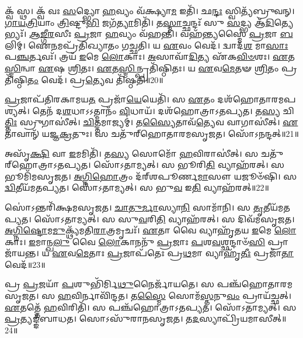 𑌕𑍍𑌵᳴ 𑌸𑍍𑌥।
𑌕𑍍𑌵᳴ 𑌵𑌃 \ul{𑌸}\-𑌦𑍍𑌭𑍍𑌯𑍋 \ul{𑌹}\-𑌵𑍍𑌯𑌂 𑌵᳴𑌕𑍍𑌷𑍍𑌯𑌾\-\ul{𑌮} 𑌇𑌤𑌿᳴।
𑌛\-\ul{𑌨𑍍𑌦𑌃} 𑌸𑍍𑌵𑌿𑌤𑍍𑌯᳴𑌬𑍍𑌰𑍁𑌵𑌨𑍍।
\-\ul{𑌗𑌾}\-\-\ul{𑌯}\-\-\ul{𑌤𑍍𑌰𑌿}\-𑌯𑌾𑌂 \ul{𑌤𑍍𑌰𑌿}\-𑌷𑍍𑌟𑍁\-\ul{𑌭𑌿} 𑌜𑌗᳴\-\ul{𑌤𑍍𑌯𑌾}\-𑌮𑌿𑌤𑌿᳴।
𑌤\-\ul{𑌸𑍍𑌮𑌾}\-𑌚𑍍𑌛𑌨𑍍𑌦𑌃᳴ 𑌸𑍁 \ul{𑌸}\-𑌦𑍍𑌭𑍍𑌯 𑌆᳴\-\ul{𑌦𑌿}\-𑌤𑍍𑌯𑍇𑌭𑍍𑌯𑌃᳴।
\-\ul{𑌆}\-\-\ul{𑌙𑍍𑌗𑍀}\-\-\ul{𑌰}\-𑌸𑍀𑌃 \ul{𑌪𑍍𑌰}\-𑌜𑌾 \ul{𑌹}\-𑌵𑍍𑌯𑌂 𑌵᳴𑌹𑌨𑍍𑌤𑌿।
𑌵𑌹᳴𑌨𑍍𑌤𑍍𑌯𑌸𑍍𑌮𑍈 \ul{𑌪𑍍𑌰}\-𑌜𑌾 \ul{𑌬}\-𑌲𑌿𑌮𑍍।
𑌐\-\ul{𑌨}\-𑌮𑌪𑍍𑌰᳴𑌤𑌿𑌖𑍍𑌯𑌾𑌤𑌂 𑌗𑌚𑍍𑌛𑌤𑌿।
𑌯 \ul{𑌏}\-𑌵𑌂 𑌵𑍇𑌦᳴।
𑌦𑍍𑌵𑌾𑌦᳴\-\ul{𑌶} 𑌮𑌾\-\ul{𑌸𑌾𑌃} 𑌪\-\ul{𑌞𑍍𑌚}\-𑌰𑍍𑌤𑌵𑌃᳴।
𑌤𑍍𑌰𑌯᳴ \ul{𑌇}\-𑌮𑍇 \ul{𑌲𑍋}\-𑌕𑌾𑌃।
\-\ul{𑌅}\-𑌸𑌾𑌵𑌾᳴\-\ul{𑌦𑌿}\-𑌤𑍍𑌯 𑌏᳴𑌕\-\ul{𑌵𑌿}\-\-\ul{𑍞}\-𑌶𑌃।
\-\ul{𑌏}\-𑌤\-\ul{𑌸𑍍𑌮𑌿}\-𑌨𑍍𑌵𑌾 \ul{𑌏}\-𑌷 \ul{𑌶𑍍𑌰𑌿}\-𑌤𑌃।
\-\ul{𑌏}\-𑌤\-\ul{𑌸𑍍𑌮𑌿}\-𑌨𑍍𑌪𑍍𑌰𑌤𑌿᳴\-𑌷𑍍𑌠𑌿𑌤𑌃।
𑌯 \ul{𑌏}\-𑌵\-\ul{𑌮𑍇}\-𑌤𑍟 \ul{𑌶𑍍𑌰𑌿}\-𑌤𑌂 𑌪𑍍𑌰𑌤𑌿᳴\-𑌷𑍍𑌠𑌿\-\ul{𑌤𑌂} 𑌵𑍇𑌦᳴।
𑌪𑍍𑌰\-\ul{𑌤𑍍𑌯𑍇}\-𑌵 𑌤𑌿᳴𑌷𑍍𑌠𑌤𑌿॥20॥\anuvakamend[\-\ul{𑌸𑍍𑌯𑌾}\-𑌦𑌿𑌤𑌿᳴ 𑌸𑌂𑌵\-\ul{𑌥𑍍𑌸}\-𑌰𑍋 𑌜᳴𑌨𑌯\-\ul{𑌧𑍍𑌵}\-𑌮𑌿𑌤𑍀𑌤𑍍𑌯᳴𑌬𑍍𑌰\-\ul{𑌵𑍀}\-𑌤𑍍𑌪𑍂\-\ul{𑌰𑍍𑌵} 𑌇𑌤𑍍𑌯𑌾᳴\-\ul{𑌦𑌿}\-𑌤𑍍𑌯𑌾\-\ul{𑌨𑍃}\-𑌤\-\ul{𑌵𑌃} 𑌷𑌟𑍍𑌚᳴]

\-\ul{𑌪𑍍𑌰}\-𑌜𑌾𑌪᳴𑌤𑌿𑌰𑌕𑌾𑌮𑌯\-\ul{𑌤} 𑌪𑍍𑌰𑌜𑌾᳴\-\ul{𑌯𑍇}\-𑌯𑍇𑌤𑌿᳴।
𑌸 \ul{𑌏}\-𑌤𑌂 𑌦𑌶᳴𑌹𑍋𑌤𑌾𑌰𑌮𑌪𑌶𑍍𑌯𑌤𑍍।
𑌤𑍇𑌨᳴ 𑌦\-\ul{𑌶}\-𑌧𑌾\-𑌽𑌽𑌤𑍍𑌮𑌾𑌨𑌂᳴ \ul{𑌵𑌿}\-𑌧𑌾𑌯᳴।
𑌦𑌶᳴𑌹𑍋𑌤𑍍𑌰𑌾\-𑌽𑌤𑌪𑍍𑌯𑌤।
𑌤\-\ul{𑌸𑍍𑌯} 𑌚𑌿\-\ul{𑌤𑍍𑌤𑌿𑌃} 𑌸𑍍𑌰𑍁𑌗𑌾𑌸𑍀॑𑌤𑍍।
\-\ul{𑌚𑌿}\-𑌤𑍍𑌤𑌮𑌾𑌜𑍍𑌯𑌮𑍍॑।
𑌤\-\ul{𑌸𑍍𑌯𑍈}\-𑌤𑌾𑌵᳴\-\ul{𑌤𑍍𑌯𑍇}\-𑌵 𑌵𑌾𑌗𑌾𑌸𑍀॑𑌤𑍍।
\-\ul{𑌏}\-𑌤𑌾𑌵𑌾𑌨𑍍᳴ 𑌯𑌜𑍍𑌞\-\ul{𑌕𑍍𑌰}\-𑌤𑍁𑌃।
𑌸 𑌚𑌤𑍁᳴𑌰𑍍‌\mbox{}𑌹𑍋𑌤𑌾𑌰𑌮\-𑌸𑍃𑌜𑌤।
𑌸𑍋᳴𑌽𑌨𑌨𑍍𑌦𑌤𑍍॥21॥

𑌅𑌸𑍃᳴\-\ul{𑌕𑍍𑌷𑌿} 𑌵𑌾 \ul{𑌇}\-𑌮𑌮𑌿𑌤𑌿᳴।
𑌤\-\ul{𑌸𑍍𑌯} 𑌸𑍋𑌮𑍋᳴ \ul{𑌹}\-𑌵𑌿𑌰𑌾𑌸𑍀॑𑌤𑍍।
𑌸 𑌚𑌤𑍁᳴𑌰𑍍‌\mbox{}𑌹𑍋𑌤𑍍𑌰𑌾\-𑌽𑌤𑌪𑍍𑌯𑌤।
𑌸𑍋᳴𑌽𑌤𑌾𑌮𑍍𑌯𑌤𑍍।
𑌸 𑌭𑍂𑌰𑌿\-\ul{𑌤𑌿} 𑌵𑍍𑌯𑌾𑌹᳴𑌰𑌤𑍍।
𑌸 𑌭𑍂𑌮𑌿᳴𑌮\-𑌸𑍃𑌜𑌤।
\-\ul{𑌅}\-\-\ul{𑌗𑍍𑌨𑌿}\-\-\ul{𑌹𑍋}\-𑌤𑍍𑌰𑌂 𑌦᳴𑌰𑍍‌\mbox{}𑌶𑌪𑍂𑌰𑍍𑌣\-\ul{𑌮𑌾}\-𑌸𑍗 𑌯𑌜𑍂𑍞᳴𑌷𑌿।
𑌸 \ul{𑌦𑍍𑌵𑌿}\-𑌤𑍀𑌯᳴𑌮𑌤𑌪𑍍𑌯𑌤।
𑌸𑍋᳴𑌽𑌤𑌾𑌮𑍍𑌯𑌤𑍍।
𑌸 𑌭𑍁\-\ul{𑌵} 𑌇\-\ul{𑌤𑌿} 𑌵𑍍𑌯𑌾𑌹᳴𑌰𑌤𑍍॥22॥

𑌸𑍋॑𑌽𑌨𑍍𑌤𑌰𑌿᳴𑌕𑍍𑌷𑌮\-𑌸𑍃𑌜𑌤।
\-\ul{𑌚𑌾}\-\-\ul{𑌤𑍁}\-\-\ul{𑌰𑍍𑌮𑌾}\-𑌸𑍍𑌯𑌾\-\ul{𑌨𑌿} 𑌸𑌾𑌮𑌾᳴𑌨𑌿।
𑌸 \ul{𑌤𑍃}\-𑌤𑍀𑌯᳴𑌮𑌤𑌪𑍍𑌯𑌤।
𑌸𑍋᳴𑌽𑌤𑌾𑌮𑍍𑌯𑌤𑍍।
𑌸 𑌸𑍁\-\ul{𑌵}\-𑌰𑌿\-\ul{𑌤𑌿} 𑌵𑍍𑌯𑌾𑌹᳴𑌰𑌤𑍍।
𑌸 𑌦𑌿𑌵᳴𑌮\-𑌸𑍃𑌜𑌤।
\-\ul{𑌅}\-\-\ul{𑌗𑍍𑌨𑌿}\-\-\ul{𑌷𑍍𑌟𑍋}\-𑌮\-\ul{𑌮𑍁}\-𑌕𑍍𑌥𑍍𑌯᳴𑌮𑌤𑌿\-\ul{𑌰𑌾}\-𑌤𑍍𑌰𑌮𑍃𑌚𑌃᳴।
\-\ul{𑌏}\-𑌤𑌾 𑌵𑍈 𑌵𑍍𑌯𑌾𑌹𑍃᳴𑌤𑌯 \ul{𑌇}\-𑌮𑍇 \ul{𑌲𑍋}\-𑌕𑌾𑌃।
\-\ul{𑌇}\-𑌮𑌾𑌨𑍍𑌖\-\ul{𑌲𑍁} 𑌵𑍈 \ul{𑌲𑍋}\-𑌕𑌾𑌨𑌨𑍁᳴ \ul{𑌪𑍍𑌰}\-𑌜𑌾𑌃 \ul{𑌪}\-𑌶\-\ul{𑌵}\-𑌶𑍍𑌛𑌨𑍍𑌦𑌾𑍞᳴\-\ul{𑌸𑌿} 𑌪𑍍𑌰𑌾𑌜𑌾᳴𑌯𑌨𑍍𑌤।
𑌯 \ul{𑌏}\-𑌵\-\ul{𑌮𑍇}\-𑌤𑌾𑌃 \ul{𑌪𑍍𑌰}\-𑌜𑌾𑌪᳴𑌤𑍇𑌃 𑌪𑍍𑌰\-\ul{𑌥}\-𑌮𑌾 𑌵𑍍𑌯𑌾𑌹𑍃᳴\-\ul{𑌤𑍀𑌃} 𑌪𑍍𑌰𑌜𑌾᳴\-\ul{𑌤𑌾} 𑌵𑍇𑌦᳴॥23॥

𑌪𑍍𑌰 \ul{𑌪𑍍𑌰}\-𑌜𑌯𑌾᳴ \ul{𑌪}\-𑌶𑍁𑌭𑌿᳴𑌰𑍍𑌮𑌿\-\ul{𑌥𑍁}\-𑌨𑍈𑌰𑍍𑌜𑌾᳴𑌯𑌤𑍇।
𑌸 𑌪𑌞𑍍𑌚᳴𑌹𑍋𑌤𑌾𑌰𑌮\-𑌸𑍃𑌜𑌤।
𑌸 \ul{𑌹}\-𑌵𑌿𑌰𑍍𑌨𑌾𑌵𑌿᳴𑌨𑍍𑌦𑌤।
𑌤\-\ul{𑌸𑍍𑌮𑍈} 𑌸𑍋𑌮᳴\-\ul{𑌸𑍍𑌤}\-𑌨𑍁\-\ul{𑌵𑌂} 𑌪𑍍𑌰𑌾𑌯᳴𑌚𑍍𑌛𑌤𑍍।
\-\ul{𑌏}\-𑌤𑌤𑍍𑌤𑍇᳴ \ul{𑌹}\-𑌵𑌿𑌰𑌿𑌤𑌿᳴।
𑌸 𑌪𑌞𑍍𑌚᳴𑌹𑍋𑌤𑍍𑌰𑌾\-𑌽𑌤𑌪𑍍𑌯𑌤।
𑌸𑍋᳴𑌽𑌤𑌾𑌮𑍍𑌯𑌤𑍍।
𑌸 \ul{𑌪𑍍𑌰}\-𑌤𑍍𑌯𑌙𑍍𑌙᳴𑌬𑌾𑌧𑌤।
𑌸𑍋𑌽𑌸𑍁᳴𑌰𑌾𑌨\-𑌸𑍃𑌜𑌤।
𑌤\-\ul{𑌦}\-𑌸𑍍𑌯𑌾𑌪𑍍𑌰𑌿᳴𑌯𑌮𑌾𑌸𑍀𑌤𑍍॥24॥

